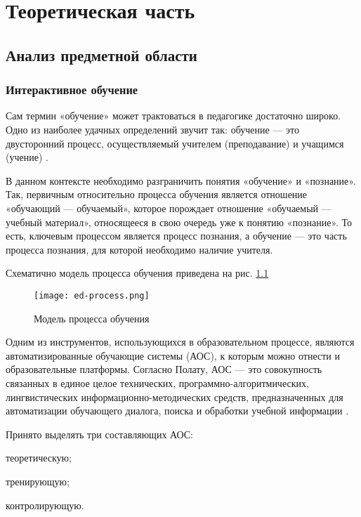 \chapter{Теоретическая часть}

\section{Анализ предметной области}
\subsection{Интерактивное обучение}
Сам термин «обучение» может трактоваться в педагогике достаточно широко. Одно из наиболее удачных определений звучит так: обучение — это двусторонний процесс, осуществляемый учителем (преподавание) и учащимся (учение) \cite{pedDict}.

В данном контексте необходимо разграничить понятия «обучение» и «познание». Так, первичным относительно процесса обучения является отношение «обучающий — обучаемый», которое порождает отношение «обучаемый — учебный материал», относящееся в свою очередь уже к понятию «познание». То есть, ключевым процессом является процесс познания, а обучение — это часть процесса познания, для которой необходимо наличие учителя.

Схематично модель процесса обучения приведена на рис. \ref{fig:ed-process}

\begin{figure}[htbp]
\centering
\texttt{[image: ed-process.png]}
\caption{Модель процесса обучения}%
\label{fig:ed-process}
\end{figure}

Одним из инструментов, использующихся в образовательном процессе, являются автоматизированные обучающие системы (АОС), к которым можно отнести и образовательные платформы. Согласно Полату, АОС — это совокупность связанных в единое целое технических, программно-алгоритмических, лингвистических информационно-методических средств, предназначенных для автоматизации обучающего диалога, поиска и обработки учебной информации \cite{Polat}.


Принято выделять три составляющих АОС:
\begin{itemize*}
\item теоретическую;
\item тренирующую;
\item контролирующую.
\end{itemize*}

